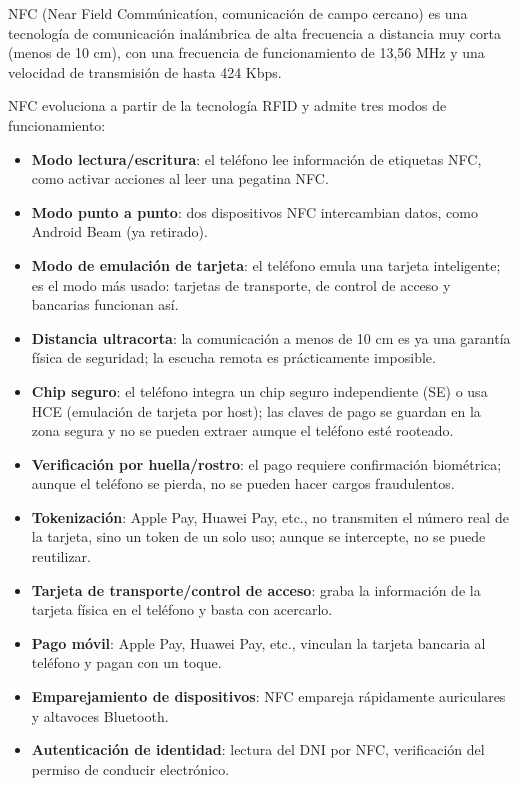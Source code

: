 
NFC (Near Field Commúnicatíon, comunicación de campo cercano) es una tecnología de comunicación inalámbrica de alta frecuencia a distancia muy corta (menos de 10 cm), con una frecuencia de funcionamiento de 13,56 MHz y una velocidad de transmisión de hasta 424 Kbps.


NFC evoluciona a partir de la tecnología RFID y admite tres modos de funcionamiento:

\begin{itemize}
  \item \textbf{Modo lectura/escritura}: el teléfono lee información de etiquetas NFC, como activar acciones al leer una pegatina NFC.
  \item \textbf{Modo punto a punto}: dos dispositivos NFC intercambian datos, como Android Beam (ya retirado).
  \item \textbf{Modo de emulación de tarjeta}: el teléfono emula una tarjeta inteligente; es el modo más usado: tarjetas de transporte, de control de acceso y bancarias funcionan así.
\end{itemize}


\begin{itemize}
  \item \textbf{Distancia ultracorta}: la comunicación a menos de 10 cm es ya una garantía física de seguridad; la escucha remota es prácticamente imposible.
  \item \textbf{Chip seguro}: el teléfono integra un chip seguro independiente (SE) o usa HCE (emulación de tarjeta por host); las claves de pago se guardan en la zona segura y no se pueden extraer aunque el teléfono esté rooteado.
  \item \textbf{Verificación por huella/rostro}: el pago requiere confirmación biométrica; aunque el teléfono se pierda, no se pueden hacer cargos fraudulentos.
  \item \textbf{Tokenización}: Apple Pay, Huawei Pay, etc., no transmiten el número real de la tarjeta, sino un token de un solo uso; aunque se intercepte, no se puede reutilizar.
\end{itemize}


\begin{itemize}
  \item \textbf{Tarjeta de transporte/control de acceso}: graba la información de la tarjeta física en el teléfono y basta con acercarlo.
  \item \textbf{Pago móvil}: Apple Pay, Huawei Pay, etc., vinculan la tarjeta bancaria al teléfono y pagan con un toque.
  \item \textbf{Emparejamiento de dispositivos}: NFC empareja rápidamente auriculares y altavoces Bluetooth.
  \item \textbf{Autenticación de identidad}: lectura del DNI por NFC, verificación del permiso de conducir electrónico.
\end{itemize}

